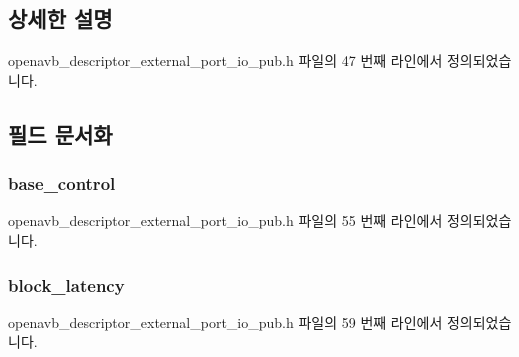 \subsection{상세한 설명}


openavb\+\_\+descriptor\+\_\+external\+\_\+port\+\_\+io\+\_\+pub.\+h 파일의 47 번째 라인에서 정의되었습니다.



\subsection{필드 문서화}
\subsubsection[{\texorpdfstring{base\+\_\+control}{base_control}}]{ base\+\_\+control}\hypertarget{structopenavb__aem__descriptor__external__port__io__t_af2706407b5397c06e6f4c45474ba75d3}{}\label{structopenavb__aem__descriptor__external__port__io__t_af2706407b5397c06e6f4c45474ba75d3}


openavb\+\_\+descriptor\+\_\+external\+\_\+port\+\_\+io\+\_\+pub.\+h 파일의 55 번째 라인에서 정의되었습니다.

\subsubsection[{\texorpdfstring{block\+\_\+latency}{block_latency}}]{ block\+\_\+latency}\hypertarget{structopenavb__aem__descriptor__external__port__io__t_ac8dd29fd39cc138a898f39f7baa876ae}{}\label{structopenavb__aem__descriptor__external__port__io__t_ac8dd29fd39cc138a898f39f7baa876ae}


openavb\+\_\+descriptor\+\_\+external\+\_\+port\+\_\+io\+\_\+pub.\+h 파일의 59 번째 라인에서 정의되었습니다.

